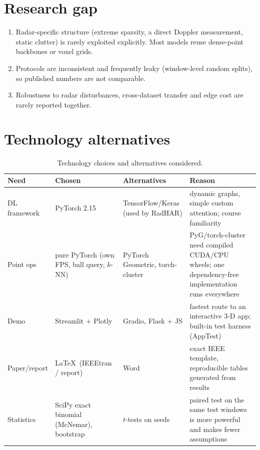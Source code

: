 \section{Research gap}
\begin{enumerate}[nosep]
\item Radar-specific structure (extreme sparsity, a direct Doppler measurement,
  static clutter) is rarely exploited explicitly. Most models reuse dense-point
  backbones or voxel grids.
\item Protocols are inconsistent and frequently leaky (window-level random
  splits), so published numbers are not comparable.
\item Robustness to radar disturbances, cross-dataset transfer and edge cost are
  rarely reported together.
\end{enumerate}

\section{Technology alternatives}
\begin{table}[h]
\centering
\caption{Technology choices and alternatives considered.}
\label{tab:tech}
\small
\begin{tabular}{L{2.6cm}L{3.2cm}L{3.4cm}L{5.0cm}}
\toprule
Need & Chosen & Alternatives & Reason \\
\midrule
DL framework & PyTorch 2.15 & TensorFlow/Keras (used by RadHAR) & dynamic graphs, simple custom attention; course familiarity \\
Point ops & pure PyTorch (own FPS, ball query, $k$-NN) & PyTorch Geometric, torch-cluster & PyG/torch-cluster need compiled CUDA/CPU wheels; one dependency-free implementation runs everywhere \\
Demo & Streamlit + Plotly & Gradio, Flask + JS & fastest route to an interactive 3-D app; built-in test harness (AppTest) \\
Paper/report & \LaTeX\ (IEEEtran / report) & Word & exact IEEE template, reproducible tables generated from results \\
Statistics & SciPy exact binomial (McNemar), bootstrap & $t$-tests on seeds & paired test on the same test windows is more powerful and makes fewer assumptions \\
\bottomrule
\end{tabular}
\end{table}
